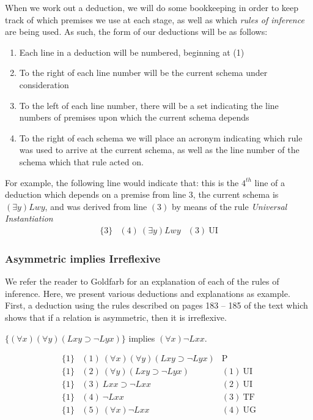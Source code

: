 When we work out a deduction, we will do some bookkeeping in order to keep track of which premises we use at each stage, as well as which \emph{rules of inference} are being used. As such, the form of our deductions will be as follows: 
\begin{enumerate}
    \item Each line in a deduction will be numbered, beginning at (1)
    \item To the right of each line number will be the current schema under consideration
    \item To the left of each line number, there will be a set indicating the line numbers of premises upon which the current schema depends
    \item To the right of each schema we will place an acronym indicating which rule was used to arrive at the current schema, as well as the line number of the schema which that rule acted on. 
\end{enumerate}

For example, the following line would indicate that: this is the $4^{th}$ line of a deduction which depends on a premise from line $3$, the current schema is $(\exists y) Lwy$, and was derived from line $(3)$ by means of the rule \emph{Universal Instantiation}
\[
   \begin{array}{lll}
\{3\} & (4)\ (\exists y) Lwy & (3)\ \mathrm{UI}
\end{array} 
\]

\subsubsection*{Asymmetric implies Irreflexive}
We refer the reader to Goldfarb for an explanation of each of the rules of inference. Here, we present various deductions and explanations as example. First, a deduction using the rules described on pages 183 -- 185 of the text which shows that if a relation is asymmetric, then it is irreflexive.
\begin{center}
$\{(\forall x)(\forall y)(Lxy\supset\neg Lyx)\}$ implies $(\forall x)\neg Lxx.$
\end{center}
\[
\begin{array}{lll}
\{1\}   & (1)\  (\forall x)(\forall y)(Lxy\supset\neg Lyx) &  \mathrm{P}\\
\{1\}   & (2)\ (\forall y)(Lxy\supset\neg Lyx) & (1) \ \mathrm{UI}\\
\{1\}   & (3)\ Lxx\supset\neg Lxx &  (2)\ \mathrm{UI}\\
\{1\}   & (4)\ \neg Lxx   & (3)\ \mathrm{TF}\\
\{1\}   & (5)\ (\forall x) \neg Lxx  & (4)\ \mathrm{UG}
\end{array}
\]

